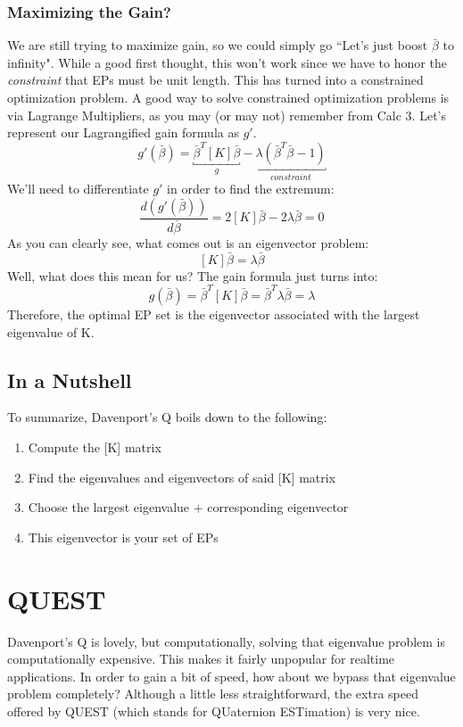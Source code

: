 \documentclass[a4paper,14pt]{extreport}
\begin{document}
\subsection{Maximizing the Gain?}
We are still trying to maximize gain, so we could simply go ``Let's just boost $\bar{\beta}$ to infinity". While a good first thought, this won't work since we have to honor the \emph{constraint} that EPs must be unit length. This has turned into a constrained optimization problem. A good way to solve constrained optimization problems is via Lagrange Multipliers, as you may (or may not) remember from Calc 3. Let's represent our Lagrangified gain formula as $g'$.
\[
g'(\bar{\beta}) = \underbracket{\bar{\beta}^T[K]\bar{\beta}}_{g} - \underbracket{\lambda(\bar{\beta}^T\bar{\beta}-1)}_{constraint}
\]
We'll need to differentiate $g'$ in order to find the extremum:
\[
\dfrac{d(g'(\bar{\beta}))}{d\bar{\beta}} = 2[K]\bar{\beta} - 2\lambda\bar{\beta}=0
\]
As you can clearly see, what comes out is an eigenvector problem:
\[
[K]\bar{\beta}=\lambda\bar{\beta}
\]
Well, what does this mean for us? The gain formula just turns into:
\[
g(\bar{\beta}) = \bar{\beta}^T[K]\bar{\beta} = \bar{\beta}^T\lambda\bar{\beta} = \lambda
\]Therefore, the optimal EP set is the eigenvector associated with the largest eigenvalue of K.
\section{In a Nutshell}

To summarize, Davenport's Q boils down to the following:
\begin{enumerate}
\item{Compute the [K] matrix}
\item{Find the eigenvalues and eigenvectors of said [K] matrix}
\item{Choose the largest eigenvalue + corresponding eigenvector}
\item{This eigenvector is your set of EPs}
\end{enumerate}

\chapter{QUEST}
Davenport's Q is lovely, but computationally, solving that eigenvalue problem is computationally expensive. This makes it fairly unpopular for realtime applications. In order to gain a bit of speed, how about we bypass that eigenvalue problem completely? Although a little less straightforward, the extra speed offered by QUEST (which stands for QUaternion ESTimation) is very nice.
\end{document}
